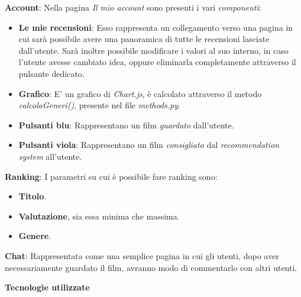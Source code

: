 \documentclass[12pt]{article}
\begin{document}
	\noindent \textbf{Account}: Nella pagina \textit{Il mio account} sono presenti i vari \textit{componenti}:
	\begin{itemize}
		\item \textbf{Le mie recensioni}: Esso rappresenta un collegamento verso una pagina in cui sarà possibile avere una panoramica di tutte le recensioni lasciate dall'utente. Sarà inoltre possibile modificare i valori al suo interno, in caso l'utente avesse cambiato idea, oppure eliminarla completamente attraverso il pulsante dedicato.
		\item \textbf{Grafico}: E' un grafico di \textit{Chart.js}, è calcolato attraverso il metodo \textit{calcolaGeneri()}, presente nel file \textit{methods.py}.
		\item \textbf{Pulsanti blu}: Rappresentano un film \textit{guardato} dall'utente.
		\item \textbf{Pulsanti viola}: Rappresentano un film \textit{consigliato} dal \textit{recommendation system} all'utente.
	\end{itemize}
	
	\noindent \textbf{Ranking}: I parametri su cui è possibile fare ranking sono:
	\begin{itemize}
		\item \textbf{Titolo}.
		\item \textbf{Valutazione}, sia essa minima che massima.
		\item \textbf{Genere}. \\
	\end{itemize}
	
	\noindent \textbf{Chat}: Rappresentata come una semplice pagina in cui gli utenti, dopo aver necessariamente guardato il film, avranno modo di commentarlo con altri utenti.
	
	\pagebreak
	
	
	\noindent \centerline {\Huge \textbf{Tecnologie utilizzate}} \\ \\
	
\end{document}
